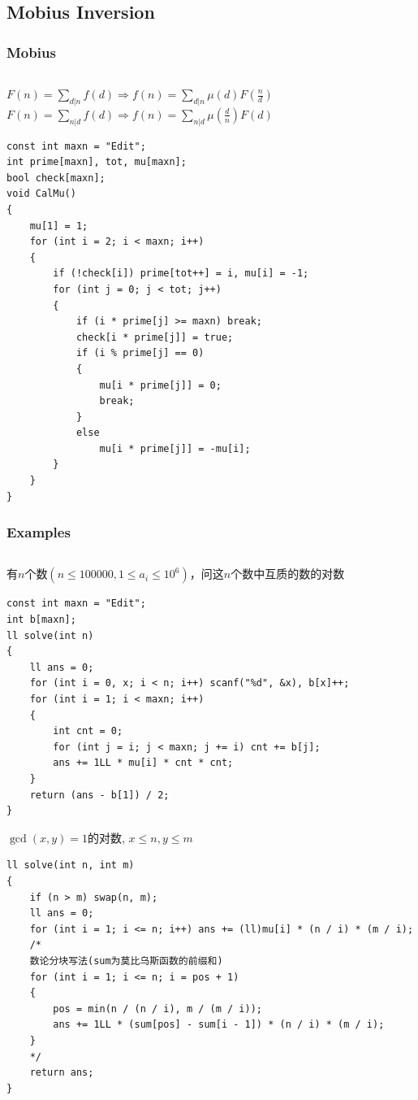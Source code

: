 \documentclass[twoside]{article}
\begin{document}
\subsection{Mobius Inversion}
\subsubsection{Mobius}
\begin{lstlisting}
\end{lstlisting}
$F(n)=\sum_{d|n}f(d)\Rightarrow f(n)=\sum_{d|n}\mu(d)F(\frac{n}{d})$\\
$F(n)=\sum_{n|d}f(d)\Rightarrow f(n)=\sum_{n|d}\mu(\frac{d}{n})F(d)$
\begin{lstlisting}
const int maxn = "Edit";
int prime[maxn], tot, mu[maxn];
bool check[maxn];
void CalMu()
{
    mu[1] = 1;
    for (int i = 2; i < maxn; i++)
    {
        if (!check[i]) prime[tot++] = i, mu[i] = -1;
        for (int j = 0; j < tot; j++)
        {
            if (i * prime[j] >= maxn) break;
            check[i * prime[j]] = true;
            if (i % prime[j] == 0)
            {
                mu[i * prime[j]] = 0;
                break;
            }
            else
                mu[i * prime[j]] = -mu[i];
        }
    }
}
\end{lstlisting}
\subsubsection{Examples}
\begin{lstlisting}
\end{lstlisting}
有$n$个数$(n \leq 100000,1 \le  a_i \le 10 ^ 6)$，问这$n$个数中互质的数的对数
\begin{lstlisting}
const int maxn = "Edit";
int b[maxn];
ll solve(int n)
{
    ll ans = 0;
    for (int i = 0, x; i < n; i++) scanf("%d", &x), b[x]++;
    for (int i = 1; i < maxn; i++)
    {
        int cnt = 0;
        for (int j = i; j < maxn; j += i) cnt += b[j];
        ans += 1LL * mu[i] * cnt * cnt;
    }
    return (ans - b[1]) / 2;
}
\end{lstlisting}
$\gcd(x,y)=1$的对数, $x \leq n, y \leq m$
\begin{lstlisting}
ll solve(int n, int m)
{
    if (n > m) swap(n, m);
    ll ans = 0;
    for (int i = 1; i <= n; i++) ans += (ll)mu[i] * (n / i) * (m / i);
    /* 
    数论分块写法(sum为莫比乌斯函数的前缀和)
    for (int i = 1; i <= n; i = pos + 1)
    {
        pos = min(n / (n / i), m / (m / i));
        ans += 1LL * (sum[pos] - sum[i - 1]) * (n / i) * (m / i);
    }
    */
    return ans;
}

\end{lstlisting}
\end{document}
